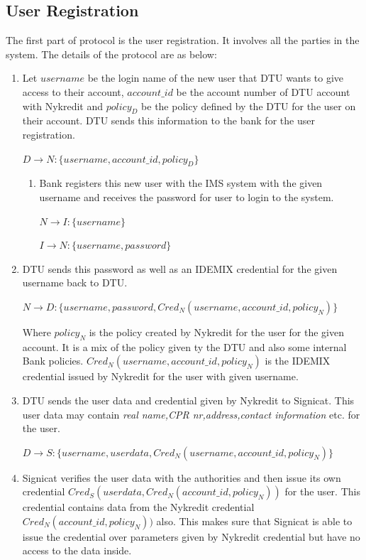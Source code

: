 \subsection{User Registration}
The first part of protocol is the user registration. It involves all the parties in the system. The details of the protocol are as below:
\begin{enumerate} 
\item 	Let  $username$ be the login name of the new user that DTU wants to give access to their account, $account\_id$ be the account number of DTU account with Nykredit and $policy_D$ be the policy defined by the DTU for the user on their account. DTU sends this information to the bank for the user registration.

\begin{center}
	$D \rightarrow N : \{username,account\_id,policy_D\}$
\end{center}
\begin{enumerate}
	\item Bank registers this new user with the IMS system with the given username and receives the password for user to login to the system.
	\begin{center}
		$N \rightarrow I : \{username\}$
		
		$I \rightarrow N : \{username,password\}$
		
	\end{center}	
\end{enumerate}
\item DTU sends this password as well as an IDEMIX credential for the given username back to DTU.
	\begin{center}
		$N \rightarrow D : \{username,password,Cred_N(username,account\_id,policy_N)\}$
	\end{center}	
Where $policy_N$ is the policy created by Nykredit for the user for the given account. It is a mix of the policy given ty the DTU and also some internal Bank policies. $Cred_N(username,account\_id,policy_N)$ is the IDEMIX credential issued by Nykredit for the user with given username.
\item DTU sends the user data and credential given by Nykredit to Signicat. This user data may contain \textit{real name,CPR nr,address,contact information} etc. for the user. 
\begin{center}
	$D \rightarrow S : \{username,userdata,Cred_N(username,account\_id,policy_N)\}$
\end{center}
\item Signicat verifies the user data with the authorities and then issue its own credential $Cred_S(userdata,Cred_N(account\_id,policy_N))$ for the user. This credential contains data from the Nykredit credential $Cred_N(account\_id,policy_N))$ also. This makes sure that Signicat is able to issue the credential over parameters given by Nykredit credential but have no access to the data inside.


\end{enumerate}
